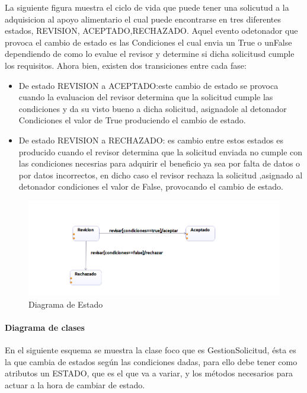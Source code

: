 La siguiente figura muestra el ciclo de vida que puede tener una solicutud a la adquisicion al apoyo alimentario el cual puede encontrarse en tres diferentes estados, REVISION, ACEPTADO,RECHAZADO. Aquel evento odetonador que provoca el cambio de estado es las Condiciones el cual envia un True o unFalse dependiendo de como lo evalue el revisor y determine si dicha solicitusd cumple los requisitos. Ahora bien, existen dos transiciones entre cada fase:
\bigskip
\begin{itemize}
	\item De estado REVISION a ACEPTADO:este cambio de estado se provoca cuando la evaluacion del revisor determina que la solicitud cumple las condiciones y da su visto bueno a dicha solicitud, asignadole al detonador Condiciones el valor de True produciendo el cambio de estado.
	
	\item De estado REVISION a RECHAZADO: es cambio entre estos estados es producido cuando el revisor determina que la solicitud enviada no cumple con las condiciones necesrias para adquirir el beneficio ya sea por falta de datos o por datos incorrectos, en dicho caso el revisor rechaza la solicitud ,asignado al detonador condiciones el valor de False, provocando el cambio de estado.
	
\end{itemize}

\begin{figure}[H]
	\centering
	\includegraphics[width=1\linewidth]{parte2/imgs/DiagramaDeEstado/Estados}
	\caption{Diagrama de Estado}
	\label{fig:diagramaEstado}
\end{figure}

\paragraph{Diagrama de clases} 

En el siguiente esquema se muestra la clase foco que es GestionSolicitud, ésta es la que cambia de estados según las condiciones dadas, para ello debe tener como atributos un ESTADO, que es el que va a variar, y los métodos necesarios para actuar a la hora de cambiar de estado.

